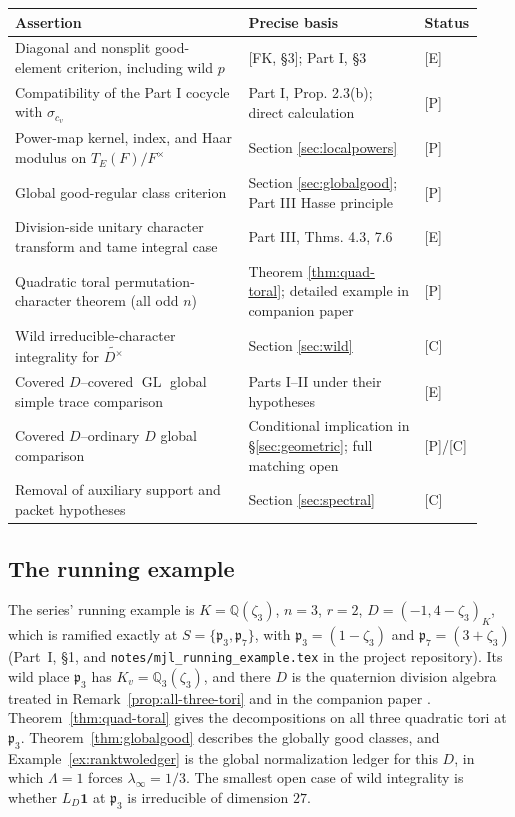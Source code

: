 \documentclass[11pt]{article}
\newcommand{\GL}{\operatorname{GL}}
\theoremstyle{plain}
\theoremstyle{definition}
\begin{document}
\begin{center}\small
\begin{tabular}{@{}p{0.49\linewidth}p{0.37\linewidth}p{0.07\linewidth}@{}}
\toprule
Assertion & Precise basis & Status\\\midrule
Diagonal and nonsplit good-element criterion, including wild $p$ & [FK, \S3]; Part I, \S3 & [E]\\
Compatibility of the Part I cocycle with $\sigma_{c_v}$ & Part I, Prop. 2.3(b); direct calculation & [P]\\
Power-map kernel, index, and Haar modulus on $T_E(F)/F^\times$ & Section \ref{sec:localpowers} & [P]\\
Global good-regular class criterion & Section \ref{sec:globalgood}; Part III Hasse principle & [P]\\
Division-side unitary character transform and tame integral case & Part III, Thms. 4.3, 7.6 & [E]\\
Quadratic toral permutation-character theorem (all odd $n$) & Theorem \ref{thm:quad-toral}; detailed example in companion paper & [P]\\
Wild irreducible-character integrality for $\widetilde{D^\times}$ & Section \ref{sec:wild} & [C]\\
Covered $D$--covered $\GL$ global simple trace comparison & Parts I--II under their hypotheses & [E]\\
Covered $D$--ordinary $D$ global comparison & Conditional implication in \S\ref{sec:geometric}; full matching open & [P]/[C]\\
Removal of auxiliary support and packet hypotheses & Section \ref{sec:spectral} & [C]\\
\bottomrule
\end{tabular}
\end{center}

\subsection*{The running example}
The series' running example is $K=\mathbb{Q}(\zeta_3)$, $n=3$, $r=2$, $D=(-1,4-\zeta_3)_K$, which is ramified exactly at $S=\{\mathfrak p_3,\mathfrak p_7\}$, with $\mathfrak p_3=(1-\zeta_3)$ and $\mathfrak p_7=(3+\zeta_3)$ (Part~I, \S1, and \texttt{notes/mjl\_running\_example.tex} in the project repository). Its wild place $\mathfrak p_3$ has $K_v=\mathbb{Q}_3(\zeta_3)$, and there $D$ is the quaternion division algebra treated in Remark~\ref{prop:all-three-tori} and in the companion paper \cite{RankTwo0}. Theorem~\ref{thm:quad-toral} gives the decompositions on all three quadratic tori at $\mathfrak p_3$. Theorem~\ref{thm:globalgood} describes the globally good classes, and Example~\ref{ex:ranktwoledger} is the global normalization ledger for this $D$, in which $\Lambda=1$ forces $\lambda_\infty=1/3$. The smallest open case of wild integrality is whether $L_D\mathbf 1$ at $\mathfrak p_3$ is irreducible of dimension $27$.
\end{document}
